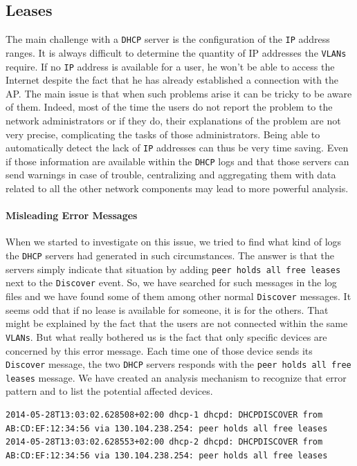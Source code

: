 \subsection{Leases}
The main challenge with a \texttt{DHCP} server is the configuration of the \texttt{IP} address ranges. It is always difficult to determine the quantity of IP addresses the \texttt{VLANs} require. If no \texttt{IP} address is available for a user, he won't be able to access the Internet despite the fact that he has already established a connection with the AP. The main issue is that when such problems arise it can be tricky to be aware of them. Indeed, most of the time the users do not report the problem to the network administrators or if they do, their explanations of the problem are not very precise, complicating the tasks of those administrators. Being able to automatically detect the lack of \texttt{IP} addresses can thus be very time saving. Even if those information are available within the \texttt{DHCP} logs and that those servers can send warnings in case of trouble, centralizing and aggregating them with data related to all the other network components may lead to more powerful analysis.


\paragraph*{Misleading Error Messages} When we started to investigate on this issue, we tried to find what kind of logs the \texttt{DHCP} servers had generated in such circumstances. The answer is that the servers simply indicate that situation by adding \texttt{peer holds all free leases} next to the \texttt{Discover} event. So, we have searched for such messages in the log files and we have found some of them among other normal \texttt{Discover} messages. It seems odd that if no lease is available for someone, it is for the others. That might be explained by the fact that the users are not connected within the same \texttt{VLANs}. But what really bothered us is the fact that only specific devices are concerned by this error message. Each time one of those device sends its \texttt{Discover} message, the two \texttt{DHCP} servers responds with the \texttt{peer holds all free leases} message. We have created an analysis mechanism to recognize that error pattern and to list the potential affected devices. \\

\begin{lstlisting}[frame=single,breaklines=true,caption={Misleading Error Message}]
2014-05-28T13:03:02.628508+02:00 dhcp-1 dhcpd: DHCPDISCOVER from AB:CD:EF:12:34:56 via 130.104.238.254: peer holds all free leases
2014-05-28T13:03:02.628553+02:00 dhcp-2 dhcpd: DHCPDISCOVER from AB:CD:EF:12:34:56 via 130.104.238.254: peer holds all free leases
\end{lstlisting}


